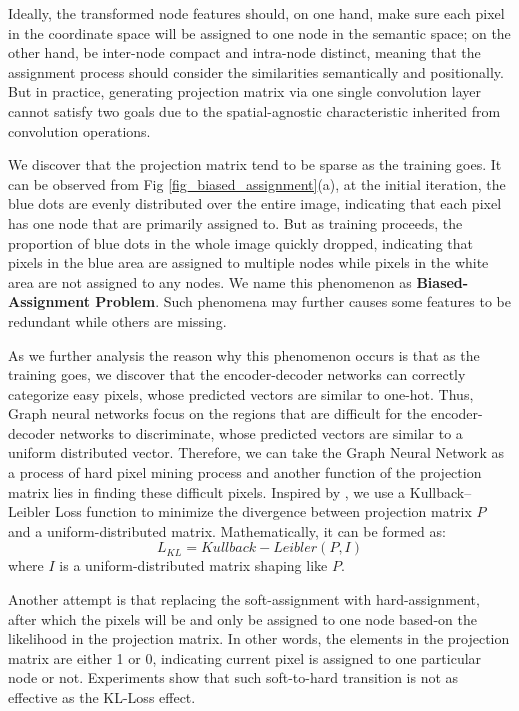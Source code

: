﻿\documentclass[journal]{IEEEtran}
\begin{document}
 
    Ideally, the transformed node features should, on one hand, make sure each pixel in the coordinate space will be assigned to one node in the semantic space; on the other hand, be inter-node compact and intra-node distinct, meaning that the assignment process should consider the similarities semantically and positionally. But in practice, generating projection matrix via one single convolution layer cannot satisfy two goals due to the spatial-agnostic characteristic inherited from convolution operations.
    
 
    We discover that the projection matrix tend to be sparse as the training goes. It can be observed from Fig \ref{fig_biased_assignment}(a), at the initial iteration, the blue dots are evenly distributed over the entire image, indicating that each pixel has one node that are primarily assigned to. But as training proceeds, the proportion of blue dots in the whole image quickly dropped, indicating that pixels in the blue area are assigned to multiple nodes while pixels in the white area are not assigned to any nodes. We name this phenomenon as \textbf{Biased-Assignment Problem}. Such phenomena may further causes some features to be redundant while others are missing.

    As we further analysis the reason why this phenomenon occurs is that as the training goes, we discover that the encoder-decoder networks can correctly categorize easy pixels, whose predicted vectors are similar to one-hot. Thus, Graph neural networks focus on the regions that are difficult for the encoder-decoder networks to discriminate, whose predicted vectors are similar to a uniform distributed vector. Therefore, we can take the Graph Neural Network as a process of hard pixel mining process and another function of the projection matrix lies in finding these difficult pixels. Inspired by \cite{li2018beyondgrids}, we use a Kullback–Leibler Loss function to minimize the divergence between projection matrix $P$ and a uniform-distributed matrix. Mathematically, it can be formed as:
    \begin{equation}\label{loss_kl}
        L_{KL} = Kullback-Leibler(P, I)
    \end{equation}
    where $I$ is a uniform-distributed matrix shaping like $P$.
    
    Another attempt is that replacing the soft-assignment with hard-assignment, after which the pixels will be and only be assigned to one node based-on the likelihood in the projection matrix. In other words, the elements in the projection matrix are either 1 or 0, indicating current pixel is assigned to one particular node or not. Experiments show that such soft-to-hard transition is not as effective as the KL-Loss effect. 
    
\end{document}
